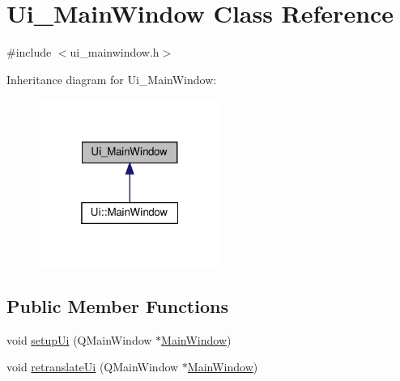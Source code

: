 \hypertarget{class_ui___main_window}{}\section{Ui\+\_\+\+Main\+Window Class Reference}
\label{class_ui___main_window}


{\ttfamily \#include $<$ui\+\_\+mainwindow.\+h$>$}



Inheritance diagram for Ui\+\_\+\+Main\+Window\+:
\nopagebreak
\begin{figure}[H]
\begin{center}
\leavevmode
\includegraphics[width=169pt]{dd/df1/class_ui___main_window__inherit__graph}
\end{center}
\end{figure}
\subsection*{Public Member Functions}
\begin{DoxyCompactItemize}
\item 
void \hyperlink{class_ui___main_window_acf4a0872c4c77d8f43a2ec66ed849b58}{setup\+Ui} (Q\+Main\+Window $\ast$\hyperlink{class_main_window}{Main\+Window})
\item 
void \hyperlink{class_ui___main_window_a097dd160c3534a204904cb374412c618}{retranslate\+Ui} (Q\+Main\+Window $\ast$\hyperlink{class_main_window}{Main\+Window})
\end{DoxyCompactItemize}
